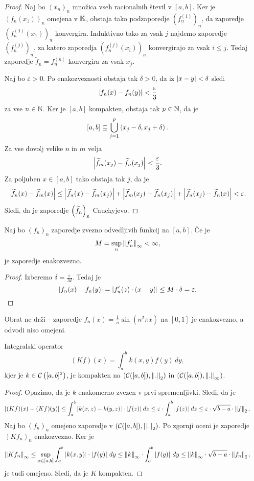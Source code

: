 \begin{proof}
Naj bo $(x_n)_n$ množica vseh racionalnih števil v $[a,b]$. Ker je
$(f_n(x_1))_n$ omejena v $\mathbb{K}$, obstaja tako podzaporedje
$(f_n^{(1)})_n$, da zaporedje $(f_n^{(1)}(x_1))_n$ konvergira.
Induktivno tako za vsak $j$ najdemo zaporedje $(f_n^{(j)})_n$, za
katero zaporedja $(f_n^{(j)}(x_i))_n$ konvergirajo za vsak
$i \leq j$. Tedaj zaporedje $\widetilde{f}_n = f_n^{(n)}$
konvergira za vsak $x_j$.

Naj bo $\varepsilon > 0$. Po enakozveznosti obstaja tak
$\delta > 0$, da iz $\left\lvert x-y\right\rvert < \delta$ sledi
\[
\left\lvert f_n(x) - f_n(y)\right\rvert < \frac{\varepsilon}{3}
\]
za vse $n \in \mathbb{N}$. Ker je $[a,b]$ kompakten, obstaja tak
$p \in \mathbb{N}$, da je
\[
[a,b] \subseteq \bigcup_{j=1}^p \left(x_j - \delta, x_j + \delta\right).
\]
Za vse dovolj velike $n$ in $m$ velja
\[
\left\lvert \widetilde{f}_m(x_j) - \widetilde{f}_n(x_j)\right\rvert <
\frac{\varepsilon}{3}.
\]
Za poljuben $x \in [a,b]$ tako obstaja tak $j$, da je
\[
\left\lvert \widetilde{f}_n(x) - \widetilde{f}_m(x)\right\rvert \leq
\left\lvert \widetilde{f}_n(x) - \widetilde{f}_m(x_j)\right\rvert +
\left\lvert \widetilde{f}_m(x_j) - \widetilde{f}_n(x_j)\right\rvert +
\left\lvert \widetilde{f}_n(x_j) - \widetilde{f}_n(x)\right\rvert <
\varepsilon.
\]
Sledi, da je zaporedje $\left(\widetilde{f}_n\right)_n$ Cauchyjevo.
\end{proof}

\begin{trditev}
Naj bo $(f_n)_n$ zaporedje zvezno odvedljivih funkcij na $[a,b]$.
Če je
\[
M = \sup_n \left\lVert f_n'\right\rVert_\infty < \infty,
\]
je zaporedje enakozvezno.
\end{trditev}

\begin{proof}
Izberemo $\delta = \frac{\varepsilon}{M}$. Tedaj je
\[
\left\lvert f_n(x) - f_n(y)\right\rvert = \left\lvert f_n'(z) \cdot (x - y)\right\rvert \leq
M \cdot \delta = \varepsilon. \qedhere
\]
\end{proof}

\begin{zgled}
Obrat ne drži -- zaporedje $f_n(x) = \frac{1}{n} \sin(n^2 \pi x)$
na $[0,1]$ je enakozvezno, a odvodi niso omejeni.
\end{zgled}

\begin{trditev}
Integralski operator
\[
(Kf)(x) = \int_a^b k(x,y) f(y)\,dy,
\]
kjer je $k \in \mathcal{C} \left([a,b]^2\right)$, je kompakten na
$(\mathcal{C}([a,b]), \left\lVert .\right\rVert_2)$ in
$(\mathcal{C}([a,b]), \left\lVert .\right\rVert_\infty)$.
\end{trditev}

\begin{proof}
Opazimo, da je $k$ enakomerno zvezen v prvi spremenljivki. Sledi,
da je
\[
\left\lvert (Kf)(x) - (Kf)(y)\right\rvert \leq
\int_a^b \left\lvert k(x,z) - k(y,z)\right\rvert \cdot \left\lvert f(z)\right\rvert\,dz \leq
\varepsilon \cdot \int_a^b \left\lvert f(z)\right\rvert\,dz \leq
\varepsilon \cdot \sqrt{b-a} \cdot \left\lVert f\right\rVert_2.
\]
Naj bo $(f_n)_n$ omejeno zaporedje v
$(\mathcal{C}([a,b]), \left\lVert .\right\rVert_2)$. Po zgornji oceni je zaporedje
$(Kf_n)_n$ enakozvezno. Ker je
\[
\left\lVert Kf_n\right\rVert_\infty \leq
\sup_{x \in [a,b]} \int_a^b \left\lvert k(x,y)\right\rvert \cdot \left\lvert f(y)\right\rvert\,dy \leq
\left\lVert k\right\rVert_\infty \cdot \int_a^b \left\lvert f(y)\right\rvert\,dy \leq
\left\lVert k\right\rVert_\infty \cdot \sqrt{b-a} \cdot \left\lVert f_n\right\rVert_2,
\]
je tudi omejeno. Sledi, da je $K$ kompakten.
\end{proof}

